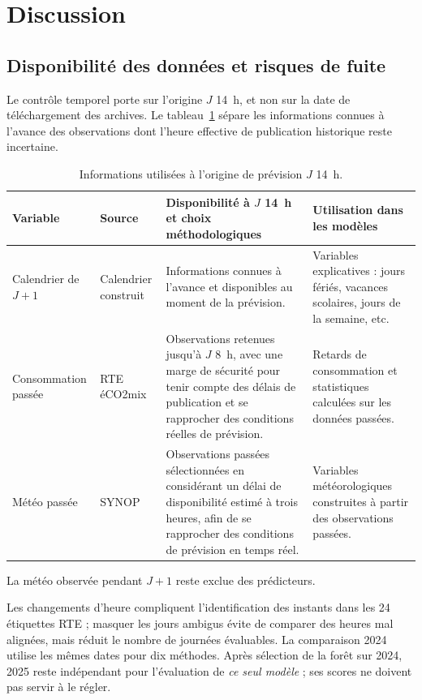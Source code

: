 \section{Discussion}
\noindent

\subsection{Disponibilité des données et risques de fuite}
\noindent

Le contrôle temporel porte sur l'origine $J$ 14~h, et non sur la date de téléchargement des archives. Le tableau~\ref{tab:disponibilite} sépare les informations connues à l'avance des observations dont l'heure effective de publication historique reste incertaine.


\begin{table}[htbp]
  \centering
  \fontsize{8}{10}\selectfont
  \renewcommand{\arraystretch}{1.35}
  \caption{Informations utilisées à l'origine de prévision $J$ 14~h.}
  \label{tab:disponibilite}
  \begin{tabularx}{\linewidth}{p{2.05cm}p{1.55cm}X X}
    \toprule
    Variable & Source & Disponibilité à $J$ 14~h et choix méthodologiques & Utilisation dans les modèles \\
    \midrule
    Calendrier de $J+1$
    & Calendrier construit
    & Informations connues à l'avance et disponibles au moment de la prévision.
    & Variables explicatives : jours fériés, vacances scolaires, jours de la semaine, etc. \\

    Consommation passée
    & RTE éCO2mix
    & Observations retenues jusqu'à $J$ 8~h, avec une marge de sécurité pour tenir compte des délais de publication et se rapprocher des conditions réelles de prévision.
    & Retards de consommation et statistiques calculées sur les données passées. \\

    Météo passée
    & SYNOP
    & Observations passées sélectionnées en considérant un délai de disponibilité estimé à trois heures, afin de se rapprocher des conditions de prévision en temps réel.
    & Variables météorologiques construites à partir des observations passées. \\
    \bottomrule
  \end{tabularx}
\end{table}


La météo observée pendant $J+1$ reste exclue des prédicteurs.

Les changements d'heure compliquent l'identification des instants dans les 24 étiquettes RTE ; masquer les jours ambigus évite de comparer des heures mal alignées, mais réduit le nombre de journées évaluables. La comparaison 2024 utilise les mêmes dates pour dix méthodes. Après sélection de la forêt sur 2024, 2025 reste indépendant pour l'évaluation de \emph{ce seul modèle} ; ses scores ne doivent pas servir à le régler.

